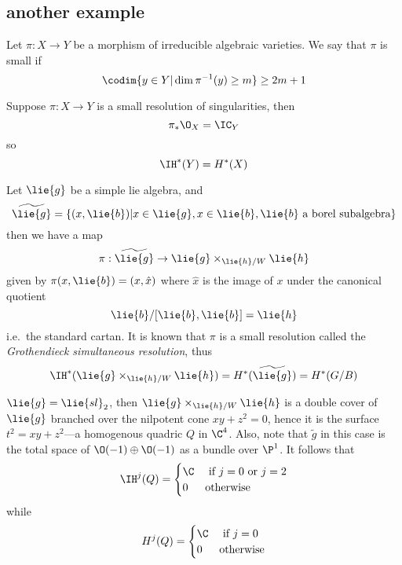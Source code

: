\documentclass[etingof-dmod.tex]{subfiles}
\begin{document}
  \subsection{another example}
    Let $\pi: X \rightarrow Y$ be a morphism of irreducible algebraic varieties.
    We say that $\pi$ is small if $$\codim \{y \in Y | \dim \pi^{-1}(y) \geq m\}
    \geq 2m+1$$

    \begin{prop}
      Suppose $\pi : X \rightarrow Y$ is a small resolution of singularities,
      then $$\pi_* \O_X  = \IC_Y$$ so $$\IH^*(Y) = H^*(X)$$
    \end{prop}

    \begin{ex}
      Let $\lie{g}$ be a simple lie algebra, and $$\widetilde{\lie{g}} =
      \{(x,\lie{b})
      | x \in \lie{g}, x \in \lie{b}, \lie{b} \text{ a borel
    subalgebra}\}$$ then we have a map $$\pi: \widetilde{\lie{g}} \rightarrow
    \lie{g} \times_{\lie{h}/W} \lie{h}$$ given by $\pi(x,\lie{b}) = (x,\hat{x})$
    where $\hat{x}$ is the image of $x$ under the canonical quotient
    $$\lie{b}/[\lie{b},\lie{b}] = \lie{h}$$ i.e.\ the standard cartan. It is
    known that $\pi$ is a small resolution called the \textit{Grothendieck
    simultaneous resolution}, thus $$\IH^*(\lie{g}\times_{\lie{h}/W}\lie{h}) =
    H^*(\widetilde{\lie{g}}) = H^*(G/B)$$
    \end{ex}

    \begin{ex}
      $\lie{g} = \lie{sl}_2$, then $\lie{g}\times_{\lie{h}/W}\lie{h}$ is a
      double cover of $\lie{g}$ branched over the nilpotent cone $xy + z^2 = 0$,
      hence it is the surface $t^2 = xy + z^2$---a homogenous quadric $Q$ in
      $\C^4$. Also, note that $\widetilde{g}$ in this case is the total space of
      $\O(-1)\oplus\O(-1)$ as a bundle over $\P^1$. It follows that $$\IH^j(Q) =
      \begin{cases} \C & \text{ if } j = 0 \text{ or } j=2\\
      0 & \text{otherwise}\end{cases}$$ while $$H^j(Q) = \begin{cases} \C
        &\text{ if } j = 0\\
      0 & \text{otherwise}\end{cases}$$
    \end{ex}
\end{document}
